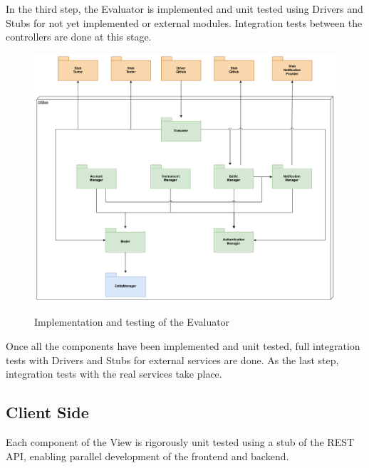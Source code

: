 \documentclass{Configuration_Files/Template}
\begin{document}
In the third step, the Evaluator is implemented and unit tested using Drivers and Stubs for not yet implemented or external modules. Integration tests between the controllers are done at this stage.

\begin{figure}[H]
\centering
\includegraphics[scale = 0.55]{Images/diagrams/ImplementationPlan_SS_Third.png}\\
\caption{Implementation and testing of the Evaluator}
\end{figure}

Once all the components have been implemented and unit tested, full integration tests with Drivers and Stubs for external services are done. As the last step, integration tests with the real services take place.

\subsection{Client Side}

Each component of the View is rigorously unit tested using a stub of the REST API, enabling parallel development of the frontend and backend.
\end{document}
